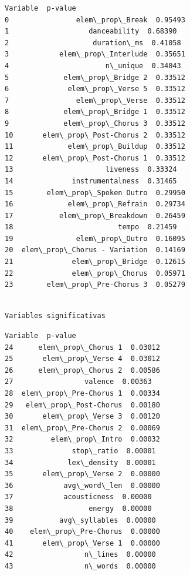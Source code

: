 \documentclass[11pt]{article}
\begin{document}
    
    \begin{Verbatim}[commandchars=\\\{\}]
                        Variable  p-value
0                elem\_prop\_Break  0.95493
1                   danceability  0.68390
2                    duration\_ms  0.41058
3            elem\_prop\_Interlude  0.35651
4                       n\_unique  0.34043
5             elem\_prop\_Bridge 2  0.33512
6              elem\_prop\_Verse 5  0.33512
7                elem\_prop\_Verse  0.33512
8             elem\_prop\_Bridge 1  0.33512
9             elem\_prop\_Chorus 3  0.33512
10       elem\_prop\_Post-Chorus 2  0.33512
11             elem\_prop\_Buildup  0.33512
12       elem\_prop\_Post-Chorus 1  0.33512
13                      liveness  0.33324
14              instrumentalness  0.31465
15        elem\_prop\_Spoken Outro  0.29950
16             elem\_prop\_Refrain  0.29734
17           elem\_prop\_Breakdown  0.26459
18                         tempo  0.21459
19               elem\_prop\_Outro  0.16095
20  elem\_prop\_Chorus - Variation  0.14169
21              elem\_prop\_Bridge  0.12615
22              elem\_prop\_Chorus  0.05971
23        elem\_prop\_Pre-Chorus 3  0.05279
    \end{Verbatim}

    
    \begin{Verbatim}[commandchars=\\\{\}]

Variables significativas

    \end{Verbatim}

    
    \begin{Verbatim}[commandchars=\\\{\}]
                  Variable  p-value
24      elem\_prop\_Chorus 1  0.03012
25       elem\_prop\_Verse 4  0.03012
26      elem\_prop\_Chorus 2  0.00586
27                 valence  0.00363
28  elem\_prop\_Pre-Chorus 1  0.00334
29   elem\_prop\_Post-Chorus  0.00180
30       elem\_prop\_Verse 3  0.00120
31  elem\_prop\_Pre-Chorus 2  0.00069
32         elem\_prop\_Intro  0.00032
33              stop\_ratio  0.00001
34             lex\_density  0.00001
35       elem\_prop\_Verse 2  0.00000
36            avg\_word\_len  0.00000
37            acousticness  0.00000
38                  energy  0.00000
39           avg\_syllables  0.00000
40    elem\_prop\_Pre-Chorus  0.00000
41       elem\_prop\_Verse 1  0.00000
42                 n\_lines  0.00000
43                 n\_words  0.00000
    \end{Verbatim}
\end{document}
